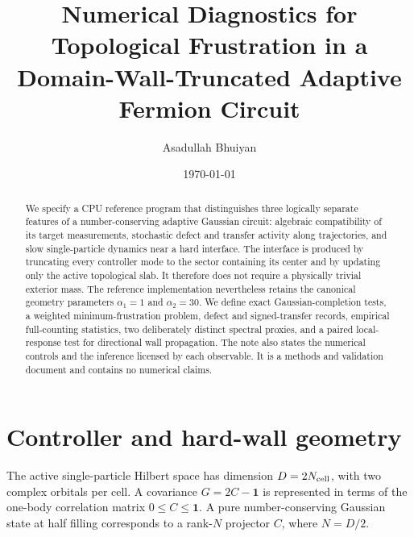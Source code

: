 \documentclass[aps,prb,onecolumn,nofootinbib,superscriptaddress]{revtex4-2}
\begin{document}
\title{\texorpdfstring{Numerical Diagnostics for Topological Frustration in a\\
Domain-Wall-Truncated Adaptive Fermion Circuit}{Numerical Diagnostics for Topological Frustration in a Domain-Wall-Truncated Adaptive Fermion Circuit}}
\author{Asadullah Bhuiyan}
\date{\today}

\begin{abstract}
We specify a CPU reference program that distinguishes three logically separate
features of a number-conserving adaptive Gaussian circuit: algebraic
compatibility of its target measurements, stochastic defect and transfer
activity along trajectories, and slow single-particle dynamics near a hard
interface.  The interface is produced by truncating every controller mode to
the sector containing its center and by updating only the active topological
slab.  It therefore does not require a physically trivial exterior mass.  The
reference implementation nevertheless retains the canonical geometry
parameters $\alpha_1=1$ and $\alpha_2=30$.  We define exact
Gaussian-completion tests, a weighted minimum-frustration problem, defect and
signed-transfer records, empirical full-counting statistics, two deliberately
distinct spectral proxies, and a paired local-response test for directional
wall propagation.  The note also states the numerical controls and the
inference licensed by each observable.  It is a methods and validation
document and contains no numerical claims.
\end{abstract}

\maketitle
\setcounter{tocdepth}{2}
\tableofcontents

\section{Controller and hard-wall geometry}

The active single-particle Hilbert space has dimension
$D=2N_{\rm cell}$, with two complex orbitals per cell.  A covariance
$G=2C-\mathbf{1}$ is represented in terms of the one-body correlation matrix
$0\leq C\leq\mathbf{1}$.  A pure number-conserving Gaussian state at half
filling corresponds to a rank-$N$ projector $C$, where $N=D/2$.
\end{document}
